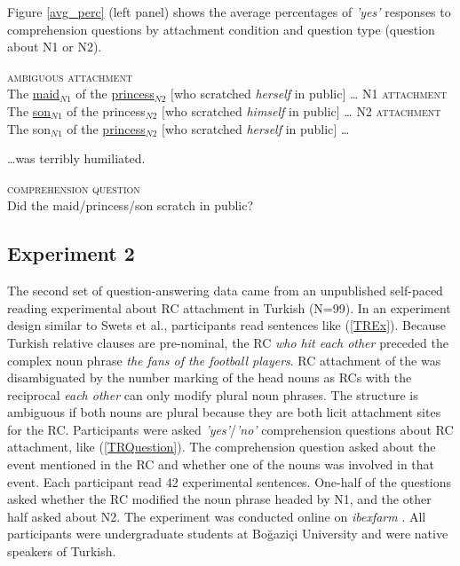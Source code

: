 \documentclass[11pt]{article}\usepackage[]{graphicx}\usepackage[]{color}
\begin{document}
Figure \ref{avg_perc} (left panel) shows the average percentages of \textit{'yes'} responses to comprehension questions by attachment condition and question type (question about N1 or N2).

\begin{exe}
\ex \label{SwetsExSentence} 
\begin{xlist}
    \ex \textsc{ambiguous attachment} \\
        The \uline{maid}$_{N1}$ of the \uline{princess}$_{N2}$ $[$who scratched \textit{herself} in public$]$ \ldots
    \ex \textsc{N1 attachment} \\
        The \uline{son}$_{N1}$ of the princess$_{N2}$ $[$who scratched \textit{himself} in public$]$ \ldots
    \ex  \textsc{N2 attachment}\\
        The son$_{N1}$ of the \uline{princess}$_{N2}$ $[$who scratched \textit{herself} in public$]$ \ldots
\end{xlist}
\ldots was terribly humiliated.
\end{exe}

\begin{exe}
\ex \label{SwetsExQuestion} \textsc{comprehension question} \\ 
    Did the maid/princess/son scratch in public?
\end{exe}


\subsection{Experiment 2}
The second set of question-answering data came from an unpublished self-paced reading experimental about RC attachment in Turkish (N=99). In an experiment design similar to Swets et al., participants read sentences like (\ref{TREx}). Because Turkish relative clauses are pre-nominal, the RC \textit{who hit each other} preceded the complex noun phrase \textit{the fans of the football players}. RC attachment of the  was disambiguated by the number marking of the head nouns as RCs with the reciprocal \textit{each other} can only modify plural noun phrases. The structure is ambiguous if both nouns are plural because they are both licit attachment sites for the RC. Participants were asked \textit{'yes'}/\textit{'no'} comprehension questions about RC attachment, like (\ref{TRQuestion}). The comprehension question asked about the event mentioned in the RC and whether one of the nouns was involved in that event.
Each participant read 42 experimental sentences. One-half of the questions asked whether the RC modified the noun phrase headed by N1, and the other half asked about N2.
The experiment was conducted online on \textit{ibexfarm} \citep{ibexfarm}. All participants were undergraduate students at Boğaziçi University and were native speakers of Turkish.
\end{document}
